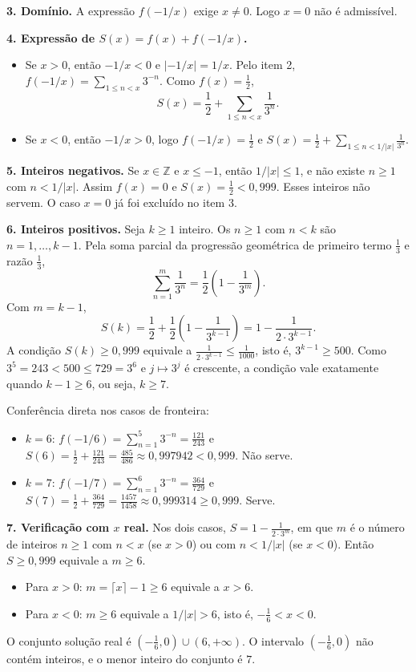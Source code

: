 \documentclass{article}%
\begin{document}
\textbf{3. Domínio.} A expressão $f(-1/x)$ exige $x\ne 0$. Logo $x=0$ não é admissível.

\textbf{4. Expressão de $S(x)=f(x)+f(-1/x)$.}
\begin{itemize}
\item Se $x>0$, então $-1/x<0$ e $\left|-1/x\right|=1/x$. Pelo item 2, $f(-1/x)=\sum_{1\le n<x}3^{-n}$. Como $f(x)=\frac12$,
\[
S(x)=\frac12+\sum_{1\le n<x}\frac{1}{3^n}.
\]
\item Se $x<0$, então $-1/x>0$, logo $f(-1/x)=\frac12$ e $S(x)=\frac12+\sum_{1\le n<1/|x|}\frac{1}{3^n}$.
\end{itemize}

\textbf{5. Inteiros negativos.} Se $x\in\mathbb{Z}$ e $x\le -1$, então $1/|x|\le 1$, e não existe $n\ge 1$ com $n<1/|x|$. Assim $f(x)=0$ e $S(x)=\frac12<0{,}999$. Esses inteiros não servem. O caso $x=0$ já foi excluído no item 3.

\textbf{6. Inteiros positivos.} Seja $k\ge 1$ inteiro. Os $n\ge 1$ com $n<k$ são $n=1,\dots,k-1$. Pela soma parcial da progressão geométrica de primeiro termo $\frac13$ e razão $\frac13$,
\[
\sum_{n=1}^{m}\frac{1}{3^n}=\frac{1}{2}\left(1-\frac{1}{3^{m}}\right).
\]
Com $m=k-1$,
\[
S(k)=\frac12+\frac12\left(1-\frac{1}{3^{k-1}}\right)=1-\frac{1}{2\cdot 3^{k-1}}.
\]
A condição $S(k)\ge 0{,}999$ equivale a $\frac{1}{2\cdot 3^{k-1}}\le\frac{1}{1000}$, isto é, $3^{k-1}\ge 500$. Como $3^5=243<500\le 729=3^6$ e $j\mapsto 3^j$ é crescente, a condição vale exatamente quando $k-1\ge 6$, ou seja, $k\ge 7$.

Conferência direta nos casos de fronteira:
\begin{itemize}
\item $k=6$: $f(-1/6)=\sum_{n=1}^{5}3^{-n}=\frac{121}{243}$ e $S(6)=\frac12+\frac{121}{243}=\frac{485}{486}\approx 0{,}997942<0{,}999$. Não serve.
\item $k=7$: $f(-1/7)=\sum_{n=1}^{6}3^{-n}=\frac{364}{729}$ e $S(7)=\frac12+\frac{364}{729}=\frac{1457}{1458}\approx 0{,}999314\ge 0{,}999$. Serve.
\end{itemize}

\textbf{7. Verificação com $x$ real.} Nos dois casos, $S=1-\frac{1}{2\cdot 3^{m}}$, em que $m$ é o número de inteiros $n\ge 1$ com $n<x$ (se $x>0$) ou com $n<1/|x|$ (se $x<0$). Então $S\ge 0{,}999$ equivale a $m\ge 6$.
\begin{itemize}
\item Para $x>0$: $m=\lceil x\rceil-1\ge 6$ equivale a $x>6$.
\item Para $x<0$: $m\ge 6$ equivale a $1/|x|>6$, isto é, $-\frac16<x<0$.
\end{itemize}
O conjunto solução real é $\left(-\frac16,0\right)\cup(6,+\infty)$. O intervalo $\left(-\frac16,0\right)$ não contém inteiros, e o menor inteiro do conjunto é $7$.
\end{document}

